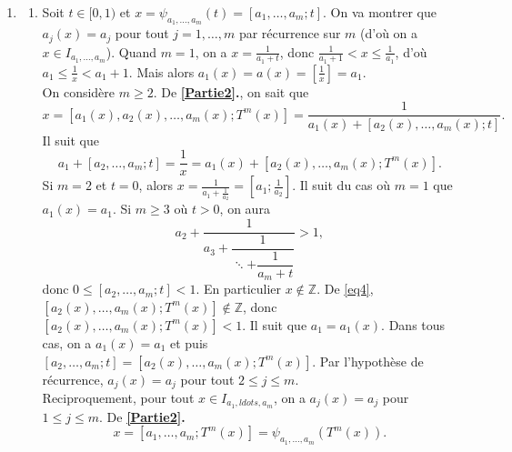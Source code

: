 \documentclass[french]{article}
\theoremstyle{definition}
\newcommand{\cin}[1]{\left[#1\right]}
\newcommand{\Zbb}{\mathbb{Z}}
\begin{document}
\begin{enumerate}
    \item \label{Partie7}
        \begin{enumerate}
            \item \label{Partie7a} Soit $t \in [0,1)$ et $x = \psi_{a_1,\ldots,a_m}(t) = [a_1,\ldots,a_m;t]$. On va montrer que $a_j(x) = a_j$ pour tout $j = 1,\ldots,m$ par r\'ecurrence sur $m$ (d'o\`u on a $x \in I_{a_1,\ldots,a_m}$). Quand $m = 1$, on a $x = \frac{1}{a_1 + t}$, donc $\frac{1}{a_1 + 1} < x \le \frac{1}{a_1}$, d'o\`u $a_1 \le \frac{1}{x} < a_1 + 1$. Mais alors $a_1(x) = a(x) = \cin{\frac{1}{x}} = a_1$. \\
            On consid\`ere $m \ge 2$. De {\bf\ref{Partie2}.}, on sait que
                $$x = [a_1(x),a_2(x),\ldots,a_m(x);T^m(x)] = \frac{1}{a_1(x) + [a_2(x),\ldots,a_m(x);t]}.$$
            Il suit que 
                \begin{equation} \label{eq4}
                    a_1 + [a_2,\ldots,a_m;t] = \frac{1}{x} = a_1(x) + [a_2(x),\ldots,a_m(x);T^m(x)].
                \end{equation}
            Si $m = 2$ et $t = 0$, alors $x = \frac{1}{a_1 + \frac{1}{a_2}} = [a_1;\frac{1}{a_2}]$. Il suit du cas o\`u $m=1$ que $a_1(x) = a_1$. Si $m \ge 3$ o\`u $t > 0$, on aura
                $$a_2 + \frac{1}{a_3 + \dfrac{1}{ \ddots + \dfrac{1}{a_m + t}}} > 1,$$
            donc $0 \le [a_2,\ldots,a_m;t] < 1$. En particulier $x \notin \Zbb$. De \eqref{eq4}, $[a_2(x),\ldots,a_m(x);T^m(x)] \notin \Zbb$, donc $[a_2(x),\ldots,a_m(x);T^m(x)] < 1$. Il suit que $a_1 = a_1(x)$. Dans tous cas, on a $a_1(x) = a_1$ et puis $[a_2,\ldots,a_m;t] = [a_2(x),\ldots,a_m(x);T^m(x)]$. Par l'hypoth\`ese de r\'ecurrence, $a_j(x) = a_j$ pour tout $2 \le j \le m$. \\
            Reciproquement, pour tout $x \in I_{a_1,ldots,a_m}$, on a $a_j(x) = a_j$ pour $1 \le j \le m$. De {\bf \ref{Partie2}.}
                $$x = [a_1,\ldots,a_m;T^m(x)] = \psi_{a_1,\ldots,a_m}(T^m(x)).$$
                

\end{enumerate}
\end{enumerate}
\end{document}
